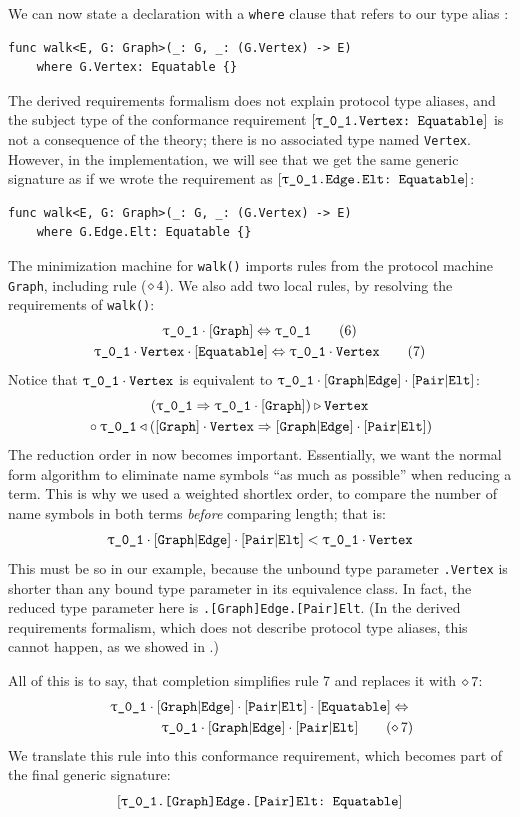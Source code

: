 \documentclass[../generics]{subfiles}
\begin{document}
\begin{example}
We can now state a declaration with a \texttt{where} clause that refers to our type alias \nV:
\begin{Verbatim}
func walk<E, G: Graph>(_: G, _: (G.Vertex) -> E)
    where G.Vertex: Equatable {}
\end{Verbatim}
The derived requirements formalism does not explain protocol type aliases, and the subject type of the conformance requirement $\ConfReq{\rU.Vertex}{Equatable}$ is not a consequence of the theory; there is no associated type named \texttt{Vertex}. However, in the implementation, we will see that we get the same generic signature as if we wrote the requirement as $\ConfReq{\rU.Edge.Elt}{Equatable}$:
\begin{Verbatim}
func walk<E, G: Graph>(_: G, _: (G.Vertex) -> E)
    where G.Edge.Elt: Equatable {}
\end{Verbatim}

The minimization machine for \texttt{walk()} imports rules from the protocol machine \texttt{Graph}, including rule ($\diamond\, 4$). We also add two local rules, by resolving the requirements of \texttt{walk()}:
\begin{gather*}
\ConfRule{\rU}{\pGraph}\tag{6}\\
\ConfRule{\rU\cdot\nV}{\pEquatable}\tag{7}
\end{gather*}
Notice that $\rU\cdot\nV$ is equivalent to $\rU\cdot\aEd\cdot\aEl$:
\begin{gather*}
(\rU \Red \rU\cdot\pGraph) \WR \nV \\
{} \circ \rU \WL (\pGraph \cdot \nV \Red \aEd\cdot\aEl)
\end{gather*}
The reduction order in  now becomes important. Essentially, we want the normal form algorithm to eliminate name symbols ``as much as possible'' when reducing a term. This is why we used a weighted shortlex order, to compare the number of name symbols in both terms \emph{before} comparing length; that is:
\[\rU\cdot\aEd\cdot\aEl < \rU\cdot\nV\]
This must be so in our example, because the unbound type parameter \texttt{\rU.Vertex} is shorter than any bound type parameter in its equivalence class. In fact, the reduced type parameter here is \texttt{\rU.[Graph]Edge.[Pair]Elt}. (In the derived requirements formalism, which does not describe protocol type aliases, this cannot happen, as we showed in .)

All of this is to say, that completion simplifies rule 7 and replaces it with $\diamond\, 7$:
\begin{gather*}
\rU\cdot\aEd\cdot\aEl\cdot\pEquatable \Eq\\
\qquad\qquad \rU\cdot\aEd\cdot\aEl
\tag{$\CRule{7}$}
\end{gather*}
We translate this rule into this conformance requirement, which becomes part of the final generic signature:
\[\ConfReq{\rU.[Graph]Edge.[Pair]Elt}{Equatable}\]
\end{example}
\end{document}
